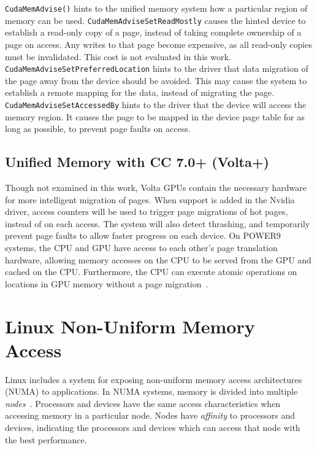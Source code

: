 \texttt{CudaMemAdvise()} hints to the unified memory system how a particular region of memory can be used.
\texttt{CudaMemAdviseSetReadMostly} causes the hinted device to establish a read-only copy of a page, instead of taking complete ownership of a page on access.
Any writes to that page become expensive, as all read-only copies must be invalidated.
This cost is not evaluated in this work.
\texttt{CudaMemAdviseSetPreferredLocation} hints to the driver that data migration of the page away from the device should be avoided.
This may cause the system to establish a remote mapping for the data, instead of migrating the page.
\texttt{CudaMemAdviseSetAccessedBy} hints to the driver that the device will access the memory region.
It causes the page to be mapped in the device page table for as long as possible, to prevent page faults on access.

\subsection {Unified Memory with CC 7.0+ (Volta+) }
Though not examined in this work, Volta GPUs contain the necessary hardware for more intelligent migration of pages.
When support is added in the Nvidia driver, access counters will be used to trigger page migrations of hot pages, instead of on each access.
The system will also detect thrashing, and temporarily prevent page faults to allow faster progress on each device.
On POWER9 systems, the CPU and GPU have access to each other's page translation hardware, allowing memory accesses on the CPU to be served from the GPU and cached on the CPU.
Furthermore, the CPU can execute atomic operations on locations in GPU memory without a page migration~\cite{sakharnykh2017unified}.

\section{Linux Non-Uniform Memory Access}
\label{sec:numa}

Linux includes a system for exposing non-uniform memory access architectures (NUMA) to applications.
In NUMA systems, memory is divided into multiple \textit{nodes}~\cite{numa2012}.
Processors and devices have the same access characteristics when accessing memory in a particular node.
Nodes have \textit{affinity} to processors and devices, indicating the processors and devices which can access that node with the best performance.

